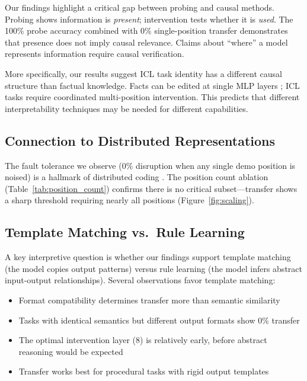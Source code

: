\documentclass{article}
\begin{document}
Our findings highlight a critical gap between probing and causal methods. Probing shows information is \emph{present}; intervention tests whether it is \emph{used}. The 100\% probe accuracy combined with 0\% single-position transfer demonstrates that presence does not imply causal relevance. Claims about ``where'' a model represents information require causal verification.

More specifically, our results suggest ICL task identity has a different causal structure than factual knowledge. Facts can be edited at single MLP layers \citep{meng2022locating}; ICL tasks require coordinated multi-position intervention. This predicts that different interpretability techniques may be needed for different capabilities.

\subsection{Connection to Distributed Representations}

The fault tolerance we observe (0\% disruption when any single demo position is noised) is a hallmark of distributed coding \citep{hinton1986distributed}. The position count ablation (Table~\ref{tab:position_count}) confirms there is no critical subset---transfer shows a sharp threshold requiring nearly all positions (Figure~\ref{fig:scaling}).

\subsection{Template Matching vs.\ Rule Learning}

A key interpretive question is whether our findings support template matching (the model copies output patterns) versus rule learning (the model infers abstract input-output relationships). Several observations favor template matching:

\begin{itemize}
    \item Format compatibility determines transfer more than semantic similarity
    \item Tasks with identical semantics but different output formats show 0\% transfer
    \item The optimal intervention layer (8) is relatively early, before abstract reasoning would be expected
    \item Transfer works best for procedural tasks with rigid output templates
\end{itemize}
\end{document}
